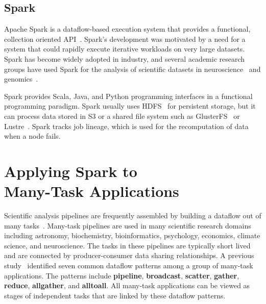 \documentclass[10pt, conference, compsocconf]{IEEEtran}
\begin{document}
\subsection{Spark}
Apache Spark is a dataflow-based execution system that provides a functional, collection
oriented API~\cite{zaharia12}. \linebreak Spark's development was motivated by a need for a
system that could rapidly execute iterative workloads on very large datasets. Spark has
become widely adopted in industry, and several academic research groups have used Spark
for the analysis of scientific datasets in neuroscience~\cite{freeman14} and genomics~\cite{nothaft15}.

Spark provides Scala, Java, and Python programming interfaces in a functional
programming paradigm. Spark usually uses HDFS~\cite{shvachko10} for persistent storage, but
it can process data stored in S3 or a shared file system such as
GlusterFS~\cite{davies13} or Lustre~\cite{donovan03}. Spark tracks job lineage, which is used for the
recomputation of data when a node fails. 

\section{Applying Spark to \\ Many-Task Applications}
\label{sec:Capability}

Scientific analysis pipelines are frequently assembled by building a dataflow out of many
tasks~\cite{katz11}. Many-task \linebreak pipelines are used in many scientific research
domains including astronomy, biochemistry, bioinformatics, psychology, economics, climate science,
and neuroscience. The tasks in these pipelines are typically short lived and are connected by
producer-consumer data sharing relationships. A previous study~\cite{katz11} identified
seven common dataflow patterns among a group of many-task applications. The patterns
include \textbf{pipeline}, \textbf{broadcast}, \textbf{scatter}, \textbf{gather},
\textbf{reduce}, \textbf{allgather}, and \textbf{alltoall}. All many-task applications
can be viewed as stages of independent tasks that are linked by these dataflow patterns.
\end{document}
